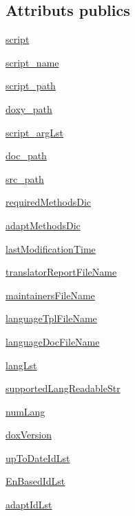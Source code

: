 \subsection*{Attributs publics}
\begin{DoxyCompactItemize}
\item 
\hyperlink{classtranslator_1_1_tr_manager_a9ac11e75a15dd955279279634ce3888c}{script}
\item 
\hyperlink{classtranslator_1_1_tr_manager_a39bea046d85a50cd1bcff1e6b57afd38}{script\+\_\+name}
\item 
\hyperlink{classtranslator_1_1_tr_manager_a380ca7992ccadc2a929ad7a44950b7f7}{script\+\_\+path}
\item 
\hyperlink{classtranslator_1_1_tr_manager_a56491de57ce612c7917a91cbecb7af86}{doxy\+\_\+path}
\item 
\hyperlink{classtranslator_1_1_tr_manager_a9350d3ae44a846f1d5b70b9ec89024e1}{script\+\_\+arg\+Lst}
\item 
\hyperlink{classtranslator_1_1_tr_manager_afc5ff8ddd2100ef75060973729f7d401}{doc\+\_\+path}
\item 
\hyperlink{classtranslator_1_1_tr_manager_aaf0a91a4f90c181466587c9f653cebd4}{src\+\_\+path}
\item 
\hyperlink{classtranslator_1_1_tr_manager_ab0ec4da4ccb84e1a87c443bddf8ee141}{required\+Methods\+Dic}
\item 
\hyperlink{classtranslator_1_1_tr_manager_aa219f874035575042c1c03592feeff74}{adapt\+Methods\+Dic}
\item 
\hyperlink{classtranslator_1_1_tr_manager_aeee786add112effb15f0750ed4733daf}{last\+Modification\+Time}
\item 
\hyperlink{classtranslator_1_1_tr_manager_a3934327a6aca42c4bc9f696c3a3a964d}{translator\+Report\+File\+Name}
\item 
\hyperlink{classtranslator_1_1_tr_manager_a2b243212946171f3d0466f03d09c81a6}{maintainers\+File\+Name}
\item 
\hyperlink{classtranslator_1_1_tr_manager_a219a9629075a57aaecc89eb5ffb8ead1}{language\+Tpl\+File\+Name}
\item 
\hyperlink{classtranslator_1_1_tr_manager_af157b547e019a15973bbf1bca3a32f26}{language\+Doc\+File\+Name}
\item 
\hyperlink{classtranslator_1_1_tr_manager_aee60909e77ca9102b085c5aae7399ea1}{lang\+Lst}
\item 
\hyperlink{classtranslator_1_1_tr_manager_a16dd53bb133743217220931c6b8b56c0}{supported\+Lang\+Readable\+Str}
\item 
\hyperlink{classtranslator_1_1_tr_manager_af4911a81ff091f9886ea7641109b5a54}{num\+Lang}
\item 
\hyperlink{classtranslator_1_1_tr_manager_aaf4515efd8f363a794823f9e9b173555}{dox\+Version}
\item 
\hyperlink{classtranslator_1_1_tr_manager_ab2ee080b368e837b1ccd27b606d2874e}{up\+To\+Date\+Id\+Lst}
\item 
\hyperlink{classtranslator_1_1_tr_manager_ab0ab22f314fc668c1476c7f20bbce810}{En\+Based\+Id\+Lst}
\item 
\hyperlink{classtranslator_1_1_tr_manager_afabfcca1fdc669722755240c6e8b7118}{adapt\+Id\+Lst}
\end{DoxyCompactItemize}


